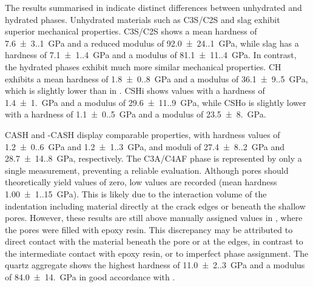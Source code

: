 The results summarised in  indicate distinct differences between unhydrated and hydrated phases.
Unhydrated materials such as \ac{C3S}/\ac{C2S} and slag exhibit superior mechanical properties.
\ac{C3S}/\ac{C2S} shows a mean hardness of \qty{7.6(3.1)}{\giga\pascal} and a reduced modulus of \qty{92.0(24.1)}{\giga\pascal}, while slag has a hardness of \qty{7.1(1.4)}{\giga\pascal} and a modulus of \qty{81.1(11.4)}{\giga\pascal}.
In contrast, the hydrated phases exhibit much more similar mechanical properties.
\ac{CH} exhibits a mean hardness of \qty{1.8(0.8)}{\giga\pascal} and a modulus of \qty{36.1(9.5)}{\giga\pascal}, which is slightly lower than in \cite{li.2025,li.2026}.
\ac{CSHi} shows values with a hardness of \qty{1.4(1.0)}{\giga\pascal} and a modulus of \qty{29.6(11.9)}{\giga\pascal}, while \ac{CSHo} is slightly lower with a hardness of \qty{1.1(0.5)}{\giga\pascal} and a modulus of \qty{23.5(8.0)}{\giga\pascal}.

\ac{CASH} and -\ac{CASH} display comparable properties, with hardness values of \qty{1.2(0.6)}{\giga\pascal} and \qty{1.2(1.3)}{\giga\pascal}, and moduli of \qty{27.4(8.2)}{\giga\pascal} and \qty{28.7(14.8)}{\giga\pascal}, respectively.
The \ac{C3A}/\ac{C4AF} phase is represented by only a single measurement, preventing a reliable evaluation.
Although pores should theoretically yield values of zero, low values are recorded (mean hardness \qty{1.00(1.15)}{\giga\pascal}).
This is likely due to the interaction volume of the indentation including material directly at the crack edges or beneath the shallow pores.
However, these results are still above manually assigned values in \cite{li.2025, li.2026}, where the pores were filled with epoxy resin.
This discrepancy may be attributed to direct contact with the material beneath the pore or at the edges, in contrast to the intermediate contact with epoxy resin, or to imperfect phase assignment.
The quartz aggregate shows the highest hardness of \qty{11.0(2.3)}{\giga\pascal} and a modulus of \qty{84.0(14.0)}{\giga\pascal} in good accordance with \cite{li.2025, li.2026}.


